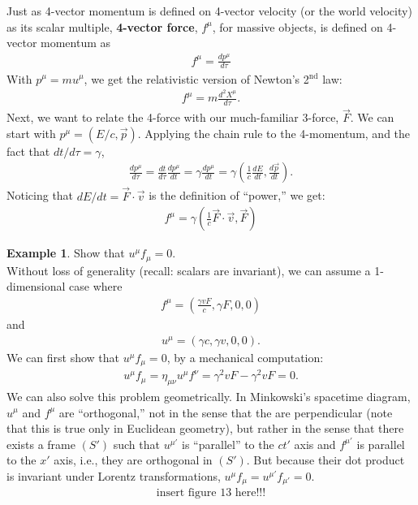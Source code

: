 \documentclass{article}
\theoremstyle{definition}
\newtheorem{exmp}{Example}[section]
\begin{document}
Just as 4-vector momentum is defined on 4-vector velocity (or the world velocity) as its scalar multiple, \textbf{4-vector force}, $f^\mu$, for massive objects, is defined on 4-vector momentum as
\begin{align*}
\boxed{f^\mu = \frac{dp^\mu}{d\tau}}
\end{align*}
With $p^\mu = mu^\mu$, we get the relativistic version of Newton's 2$^\text{nd}$ law:
\begin{align*}
f^\mu = m\frac{d^2X^\mu}{d\tau}.
\end{align*}
Next, we want to relate the 4-force with our much-familiar 3-force, $\vec{F}$. We can start with $p^\mu = (E/c, \vec{p})$. Applying the chain rule to the 4-momentum, and the fact that $dt/d\tau = \gamma$,
\begin{align*}
\frac{dp^\mu}{d\tau} = \frac{dt}{d\tau}\frac{dp^\mu}{dt} = \gamma\frac{dp^\mu}{dt} = \gamma\left( \frac{1}{c}\frac{dE}{dt},\frac{d\vec{p}}{dt} \right).
\end{align*}
Noticing that $dE/dt = \vec{F}\cdot\vec{v}$ is the definition of ``power,'' we get:
\begin{align*}
\boxed{f^\mu = \gamma\left( \frac{1}{c}\vec{F}\cdot\vec{v}, \vec{F} \right)} 
\end{align*}
\begin{exmp}
	Show that $u^\mu f_\mu = 0$.\\
	
	Without loss of generality (recall: scalars are invariant), we can assume a 1-dimensional case where
	\begin{align*}
	f^\mu = \left( \frac{\gamma v F}{c}, \gamma F, 0,0\right) 
	\end{align*}
	and
	\begin{align*}
	u^\mu = \left( \gamma c, \gamma v,0,0 \right). 
	\end{align*}
	We can first show that $u^\mu f_\mu = 0$, by a mechanical computation:
	\begin{align*}
	u^\mu f_\mu = \eta_{\mu\nu}u^\mu f^\nu = \gamma^2vF - \gamma^2 vF = 0.
	\end{align*}
	We can also solve this problem geometrically. In Minkowski's spacetime diagram, $u^\mu$ and $f^\mu$ are ``orthogonal,'' not in the sense that the are perpendicular (note that this is true only in Euclidean geometry), but rather in the sense that there exists a frame $(S')$ such that $u^{\mu'}$ is ``parallel'' to the $ct'$ axis and $f^{\mu'}$ is parallel to the $x'$ axis, i.e., they are orthogonal in $(S')$. But because their dot product is invariant under Lorentz transformations, $u^\mu f_\mu = u^{\mu'}f_{\mu'} = 0$. 
	\begin{align*}
	\text{insert figure 13 here!!!}
	\end{align*}
\end{exmp}
\end{document}
